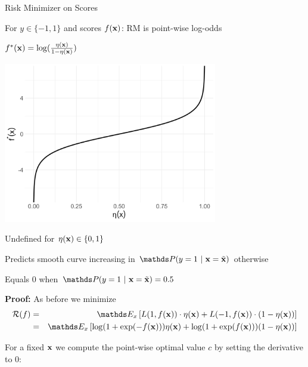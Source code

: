 \documentclass[11pt,compress,t,notes=noshow, xcolor=table]{beamer}
\begin{document}
\begin{vbframe}{Risk Minimizer on Scores}


\begin{itemizeS}
    \item For $y \in \{-1, 1\}$ and scores $f(\mathbf{x})$: RM is point-wise log-odds
\end{itemizeS}


\begin{minipage}{0.3\textwidth} 
	\centering
	{$f^{\ast}(\mathbf{x}) =  \log (\frac{\eta(\mathbf{x}) }{1-\eta(\mathbf{x}) })$}
\end{minipage}
\hspace{-.03\textwidth}
\begin{minipage}{0.7\textwidth}
	\centering	
	\includegraphics[width=0.7\textwidth]{figure/logistic_inverse.png}
\end{minipage}

\begin{itemizeM}
    \item Undefined for $\eta(\mathbf{x}) \in \{0, 1\}$
    \item Predicts smooth curve increasing in $\P(y=1~|~\xv = \xtil)$ otherwise
    \item Equals $0$ when $\P(y=1~|~\xv = \xtil) = 0.5$
\end{itemizeM}


\framebreak 

\textbf{Proof: } As before we minimize 
\begin{eqnarray*}
  \riskf &=& \E_x \left[L(1, \fx) \cdot \eta(\xv) + L(-1, \fx) \cdot (1 - \eta(\xv)) \right] \\
  &=& \E_x \left[ \log(1 + \exp(- \fx)) \eta(\xv)+ \log(1 + \exp(\fx)) (1 - \eta(\xv)) \right] 
\end{eqnarray*}

For a fixed $\mathbf{x}$ we compute the point-wise optimal value $c$ by setting the derivative to $0$: 


\end{vbframe}
\end{document}
